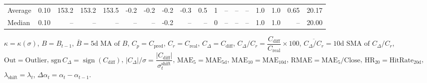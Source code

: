 \begin{threeparttable}
{\begin{tabular}{lrrrrrrrrrrrrrrrrr}
Average &     0.10 & 153.2 & 153.2 & 153.5 &       -0.2 &           -0.2 &                      -0.2 &                     -0.3 &                 0.5 &              1 &         -- &        -- &             -- &              1.0 &                 1.0 &            0.65 &                  20.17 \\
 Median &     0.10 &    -- &    -- &    -- &         -- &             -- &                      -0.2 &                       -- &                  -- &              0 &         -- &        -- &             -- &              1.0 &                 1.0 &              -- &                  20.00 \\
\bottomrule
\end{tabular}
}
\begin{tablenotes}\footnotesize
\item $\kappa=\kappa(\sigma)$, $B=B_{t-1}$, $\overline{B}=\text{5d MA of }B$, $C_p=C_{\text{pred}}$, $C_r=C_{\text{real}}$, $C_\Delta=C_{\text{diff}}$, $C_\Delta/C_r=\dfrac{C_{\text{diff}}}{C_{\text{real}}}\times100$, $\overline{C_\Delta/C_r}=\text{10d SMA of }C_\Delta/C_r$, $\mathrm{Out}=\text{Outlier}$, $\mathrm{sgn}\,C_\Delta=\operatorname{sign}(C_{\text{diff}})$, $|C_\Delta|/\sigma=\dfrac{|C_{\text{diff}}|}{\sigma_t^{\text{shift}}}$, $\mathrm{MAE}_5=\mathrm{MAE}_{5\text{d}}$, $\mathrm{MAE}_{10}=\mathrm{MAE}_{10\text{d}}$, $\mathrm{RMAE}= \mathrm{MAE}_5 / \text{Close}$, $\mathrm{HR}_{20}=\mathrm{HitRate}_{20\text{d}}$, $\lambda_{\text{shift}}=\lambda_t$, $\Delta\alpha_t=\alpha_t-\alpha_{t-1}$.
\end{tablenotes}
\end{threeparttable}
\endgroup

